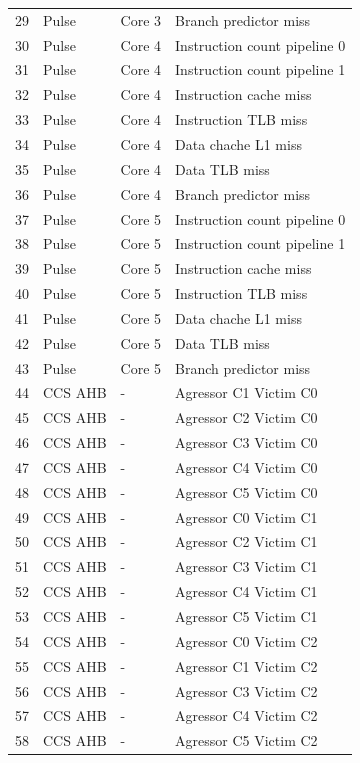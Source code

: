 \begin{center}
\begin{longtable}{|l|l|l|l|}
29 & Pulse & Core 3 &  Branch predictor miss \\
30 & Pulse & Core 4 &  Instruction count pipeline 0 \\
31 & Pulse & Core 4 &  Instruction count pipeline 1 \\
32 & Pulse & Core 4 &  Instruction cache miss \\
33 & Pulse & Core 4 &  Instruction TLB miss \\
34 & Pulse & Core 4 &  Data chache L1 miss \\
35 & Pulse & Core 4 &  Data TLB miss \\
36 & Pulse & Core 4 &  Branch predictor miss \\
37 & Pulse & Core 5 &  Instruction count pipeline 0 \\
38 & Pulse & Core 5 &  Instruction count pipeline 1 \\
39 & Pulse & Core 5 &  Instruction cache miss \\
40 & Pulse & Core 5 &  Instruction TLB miss \\
41 & Pulse & Core 5 &  Data chache L1 miss \\
42 & Pulse & Core 5 &  Data TLB miss \\
43 & Pulse & Core 5 &  Branch predictor miss \\
44 & CCS AHB &  -  &  Agressor C1 Victim C0\\
45 & CCS AHB &  -  &  Agressor C2 Victim C0\\
46 & CCS AHB &  -  &  Agressor C3 Victim C0\\
47 & CCS AHB &  -  &  Agressor C4 Victim C0\\
48 & CCS AHB &  -  &  Agressor C5 Victim C0\\
49 & CCS AHB &  -  &  Agressor C0 Victim C1\\
50 & CCS AHB &  -  &  Agressor C2 Victim C1\\
51 & CCS AHB &  -  &  Agressor C3 Victim C1\\
52 & CCS AHB &  -  &  Agressor C4 Victim C1\\
53 & CCS AHB &  -  &  Agressor C5 Victim C1\\
54 & CCS AHB &  -  &  Agressor C0 Victim C2\\
55 & CCS AHB &  -  &  Agressor C1 Victim C2\\
56 & CCS AHB &  -  &  Agressor C3 Victim C2\\
57 & CCS AHB &  -  &  Agressor C4 Victim C2\\
58 & CCS AHB &  -  &  Agressor C5 Victim C2\\

\end{longtable}
\end{center}
